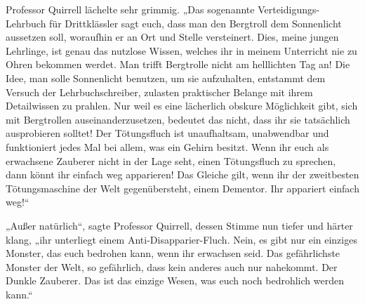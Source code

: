 Professor Quirrell lächelte sehr grimmig. „Das sogenannte Verteidigungs-Lehrbuch für Drittklässler sagt euch, dass man den Bergtroll dem Sonnenlicht aussetzen soll, woraufhin er an Ort und Stelle versteinert. Dies, meine jungen Lehrlinge, ist genau das nutzlose Wissen, welches ihr in meinem Unterricht nie zu Ohren bekommen werdet. Man trifft Bergtrolle nicht am helllichten Tag an! Die Idee, man solle Sonnenlicht benutzen, um sie aufzuhalten, entstammt dem Versuch der Lehrbuchschreiber, zulasten praktischer Belange mit ihrem Detailwissen zu prahlen. Nur weil es eine lächerlich obskure Möglichkeit gibt, sich mit Bergtrollen auseinanderzusetzen, bedeutet das nicht, dass ihr sie tatsächlich ausprobieren solltet! Der Tötungsfluch ist unaufhaltsam, unabwendbar und funktioniert jedes Mal bei allem, was ein Gehirn besitzt. Wenn ihr euch als erwachsene Zauberer nicht in der Lage seht, einen Tötungsfluch zu sprechen, dann könnt ihr einfach weg apparieren! Das Gleiche gilt, wenn ihr der zweitbesten Tötungsmaschine der Welt gegenübersteht, einem Dementor. Ihr appariert einfach weg!“

„Außer natürlich“, sagte Professor Quirrell, dessen Stimme nun tiefer und härter klang, „ihr unterliegt einem Anti-Disapparier-Fluch. Nein, es gibt nur ein einziges Monster, das euch bedrohen kann, wenn ihr erwachsen seid. Das gefährlichste Monster der Welt, so gefährlich, dass kein anderes auch nur nahekommt. Der Dunkle Zauberer. Das ist das einzige Wesen, was euch noch bedrohlich werden kann.“


